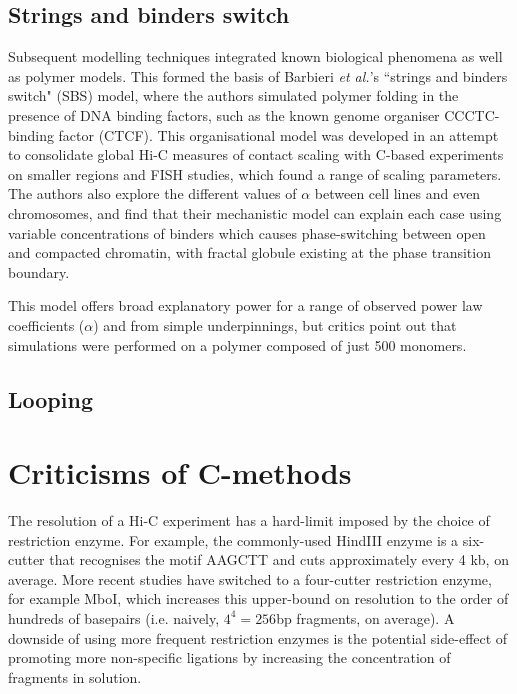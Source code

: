 \documentclass[a4paper,10pt,oneside]{book}
\begin{document}
\subsection{Strings and binders switch}

Subsequent modelling techniques integrated known biological phenomena as well as polymer models. This formed the basis of Barbieri \emph{et al.}'s\cite{Barbieri2012} ``strings and binders switch" (SBS) model, where the authors simulated polymer folding in the presence of DNA binding factors, such as the known genome organiser CCCTC-binding factor (CTCF).\cite{Phillips2009} This organisational model was developed in an attempt to consolidate global Hi-C measures of contact scaling with C-based experiments on smaller regions and FISH studies, which found a range of scaling parameters. The authors also explore the different values of $\alpha$ between cell lines and even chromosomes, and find that their mechanistic model can explain each case using variable concentrations of binders which causes phase-switching between open and compacted chromatin, with fractal globule existing at the phase transition boundary.

This model offers broad explanatory power for a range of observed power law coefficients ($\alpha$) and from simple underpinnings, but critics point out that simulations were performed on a polymer composed of just 500 monomers.

\subsection{Looping}

\section{Criticisms of C-methods}

The resolution of a Hi-C experiment has a hard-limit imposed by the choice of restriction enzyme. For example, the commonly-used HindIII enzyme is a six-cutter that recognises the motif AAGCTT and cuts approximately every 4 kb, on average.\cite{DeWit2012} More recent studies have switched to a four-cutter restriction enzyme, for example MboI,\cite{Rao2014} which increases this upper-bound on resolution to the order of hundreds of basepairs (i.e. naively, $4^{4} = 256$bp fragments, on average). A downside of using more frequent restriction enzymes is the potential side-effect of promoting more non-specific ligations by increasing the concentration of fragments in solution.\cite{Rao2014} 
\end{document}
